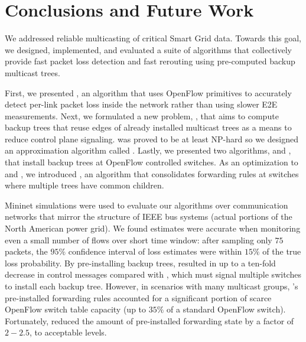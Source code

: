 \section{Conclusions and Future Work}
\label{sec:conclude}

We addressed reliable multicasting of critical Smart Grid data.
Towards this goal, we designed, implemented, and evaluated a suite of algorithms that collectively provide fast packet loss detection and fast rerouting using pre-computed backup multicast trees. 

First, we presented \pcnts, an algorithm that uses OpenFlow primitives to accurately detect per-link packet loss inside the network rather than using slower E2E measurements. %
Next, we formulated a new problem, \mcs, that aims to compute 
backup trees that reuse edges of already installed multicast trees as a means to reduce control plane signaling.  \mc was proved to be at least NP-hard
so we designed an approximation algorithm called \steiners.  Lastly, we presented two algorithms, \pre and \posts, that install backup trees at OpenFlow controlled switches. 
As an optimization to \pre and \posts, 
we introduced \merges, an algorithm that consolidates forwarding rules at switches where multiple trees have common children.


Mininet simulations were used to evaluate our algorithms over communication networks that mirror the structure of IEEE bus systems (actual portions of the North American power grid).
We found \pcnt estimates were accurate when monitoring even a small number of flows over short time window: after sampling only $75$ packets, the $95\%$ confidence interval of \pcnt loss estimates 
were within $15\%$ of the true loss probability. By pre-installing 
backup trees, \pre resulted in up to a ten-fold decrease in control messages compared with \posts, which must signal multiple switches to install each backup tree. 
However, in scenarios with many multicast groups, \pres's pre-installed forwarding rules accounted for a significant portion of scarce OpenFlow switch table capacity (up to $35\%$ of
a standard OpenFlow switch). Fortunately, \merge reduced the amount of pre-installed forwarding state by a factor of $2-2.5$, to acceptable levels.

